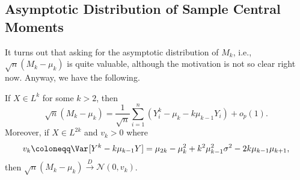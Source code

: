 \subsection{Asymptotic Distribution of Sample Central Moments}
It turns out that asking for the asymptotic distribution of \(M_k\), i.e., \(\sqrt{n} (M_k - \mu _k)\) is quite valuable, although the motivation is not so clear right now. Anyway, we have the following.

\begin{theorem}\label{thm:asymptotic-distribution-sample-central-moment}
	If \(X \in L^{k}\) for some \(k > 2\), then
	\[
		\sqrt{n} (M_k - \mu _k)
		= \frac{1}{\sqrt{n} } \sum_{i=1}^{n} (Y_i^k - \mu _k - k \mu _{k-1} Y_i) + o_p(1).
	\]
	Moreover, if \(X \in L^{2k}\) and \(v_k > 0\) where
	\[
		v_k
		\coloneqq \Var_{}[Y^k - k \mu _{k-1}Y]
		= \mu _{2k} - \mu _k^2 + k^2 \mu _{k-1}^2 \sigma ^2 - 2 k \mu _{k-1} \mu _{k+1} ,
	\]
	then \(\sqrt{n} (M_k - \mu _k) \overset{D}{\to} \mathcal{N} (0, v_k)\).
\end{theorem}
